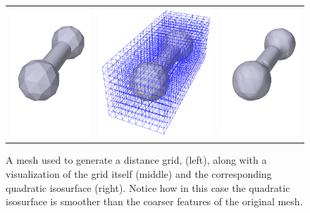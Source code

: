 \begin{figure}[ht]
\begin{center}
\begin{tabular}{ccc}
    \else
       \includegraphics[width=1.75in]{images/dumbbellMesh}&
       \includegraphics[width=2.5in]{images/dumbbellDistanceGrid}&
       \includegraphics[width=1.75in]{images/dumbbellDistanceSurface}
    \fi
  \end{tabular}
\end{center}
\caption{A mesh used to generate a distance grid, (left), along with a
visualization of the grid itself (middle) and the corresponding
quadratic isosurface (right). Notice how in this case the quadratic
isosurface is smoother than the coarser features of the
original mesh.}
\label{rigidBodySurfacesAndGrid:fig}
\end{figure}

